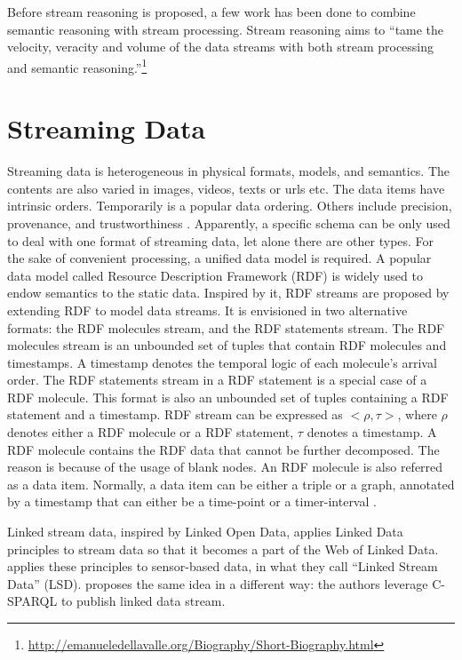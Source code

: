 Before stream reasoning \cite{della2009s} is proposed, a few work has been done to combine semantic reasoning with stream processing. 
Stream reasoning aims to ``tame the velocity, veracity and volume of the data streams with both stream processing and semantic reasoning.''\footnote{\url{http://emanueledellavalle.org/Biography/Short-Biography.html}}
%
\section{Streaming Data}
Streaming data is heterogeneous in physical formats, models, and semantics.
The contents are also varied in images, videos, texts or urls etc.
The data items have intrinsic orders.
Temporarily is a popular data ordering. 
Others include precision, provenance, and trustworthiness \cite{della2013order}.
Apparently, a specific schema can be only used to deal with one format of streaming data, let alone there are other types. 
For the sake of convenient processing, a unified data model is required.
A popular data model called Resource Description Framework (RDF) is widely used to endow semantics to the static data.
Inspired by it, RDF streams \cite{della2009first} are proposed by extending RDF to model data streams. 
It is envisioned in two alternative formats: the RDF molecules stream, and the RDF statements stream.
The RDF molecules stream is an unbounded set of tuples that contain RDF molecules \cite{ding2005tracking} and timestamps.
A timestamp denotes the temporal logic of each molecule's arrival order.
The RDF statements stream in a RDF statement is a special case of a RDF molecule.
This format is also an unbounded set of tuples containing a RDF statement and a timestamp. 
RDF stream can be expressed as $<\rho , \tau>$, where $\rho$ denotes either a RDF molecule or a RDF statement, $\tau$ denotes a timestamp.
A RDF molecule contains the RDF data that cannot be further decomposed. 
The reason is because of the usage of blank nodes.
An RDF molecule is also referred as a data item. 
Normally, a data item can be either a triple or a graph, annotated by a timestamp that can either be a time-point or a timer-interval \cite{srtutorial}. 

Linked stream data, inspired by Linked Open Data, applies Linked Data principles \cite{bizer2008linked} to stream data so that it becomes a part of the Web of Linked Data.
\cite{sequeda2009linked} applies these principles to sensor-based data, in what they call ``Linked Stream Data'' (LSD). 
\cite{barbieri2010proposal} proposes the same idea in a different way: 
the authors leverage C-SPARQL \cite{barbieri2009c} to publish linked data stream.

